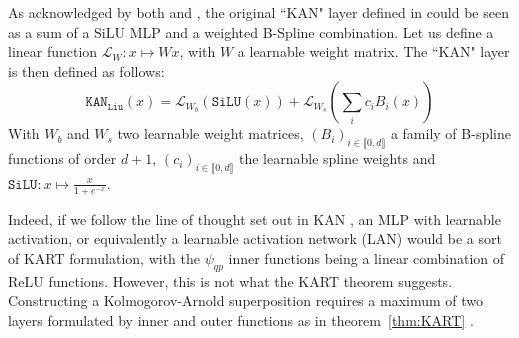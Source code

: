 \documentclass{article} %
\theoremstyle{plain}
\theoremstyle{definition}
\theoremstyle{remark}
\begin{document}




As acknowledged by both \cite{liu2025kan} and \cite{yang2025kolmogorovarnold}, the original ``KAN" layer defined in \cite{liu2025kan} could be seen as a sum of a SiLU MLP  and a weighted B-Spline combination. Let us define a linear function $\mathcal{L}_W \colon x \mapsto Wx$, with $W$ a learnable weight matrix. The ``KAN" layer \cite{liu2025kan}  is then defined as follows:
\begin{equation}
    \texttt{KAN}_\texttt{Liu}(x)=\mathcal{L}_{W_b}(\texttt{SiLU}(x)) + \mathcal{L}_{W_s} \left(\sum_i c_i B_i(x)\right)
\end{equation}
With  $W_b$ and $W_s$ two learnable weight matrices,  $(B_i)_{i \in \llbracket 0,d\rrbracket}$ a family of B-spline functions of order $d+1$, $(c_i)_{i \in \llbracket 0,d\rrbracket}$ the learnable spline weights and $\texttt{SiLU} \colon x \mapsto \frac{x}{1 + e^{-x}}$.

Indeed, if we follow the line of thought set out in KAN \cite{liu2025kan}, an MLP with learnable activation, or equivalently a learnable activation network (LAN) would be a sort of KART formulation, with the $\psi_{qp}$ inner functions being a linear combination of ReLU functions. However, this is not what the KART theorem suggests. Constructing a Kolmogorov-Arnold superposition requires a maximum of two layers formulated by inner and outer functions as in theorem~\ref{thm:KART} \citep{ismailov2025addressing}. 
\end{document}
